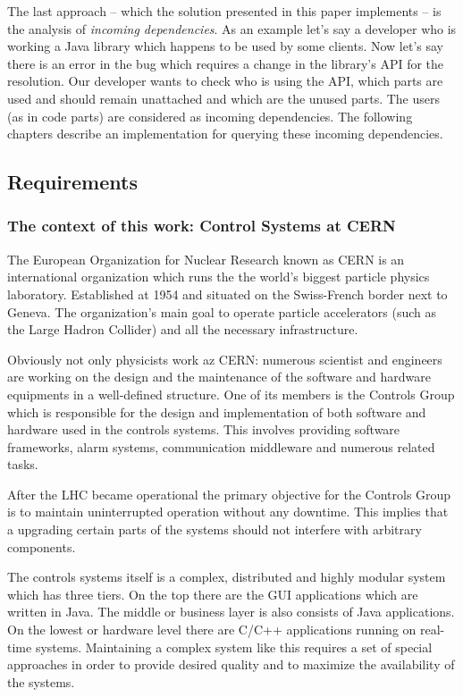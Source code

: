 The last approach -- which the solution presented in this paper implements -- is
the analysis of \emph{incoming dependencies}. As an example let's say a
developer who is working a Java library which happens to be used by some
clients. Now let's say there is an error in the bug which requires a change in
the library's API for the resolution. Our developer wants to check who is using
the API, which parts are used and should remain unattached and which are the
unused parts. The users (as in code parts) are considered as incoming
dependencies. The following chapters describe an implementation for querying these 
incoming dependencies. 
 


\subsection{Requirements}

\subsubsection{The context of this work: Control Systems at CERN}


The European Organization for Nuclear Research known as CERN is an international
organization which runs the the world's biggest particle physics laboratory.
Established at 1954 and situated on the Swiss-French border next to Geneva. The
organization's main goal to operate particle accelerators (such as the Large
Hadron Collider) and all the necessary infrastructure.

Obviously not only physicists work az CERN: numerous scientist and engineers are
working on the design and the maintenance of the software and hardware
equipments in a well-defined structure. One of its members is the Controls Group
which is responsible for the design and implementation of both software and
hardware used in the controls systems. This involves providing software
frameworks, alarm systems, communication middleware and numerous related tasks.

After the LHC became operational the  primary objective for the Controls Group
is to maintain uninterrupted operation without any downtime. This implies that a
upgrading certain parts of the systems should not interfere with arbitrary
components.

The controls systems itself is a complex, distributed and highly modular system
which has three tiers. On the top there are the GUI applications which are
written in Java. The middle or business layer is also consists of Java
applications. On the lowest or hardware level there are C/C++ applications
running on real-time systems. Maintaining a complex system like this requires a
set of special approaches in order to provide desired quality and to maximize
the availability of the systems.


